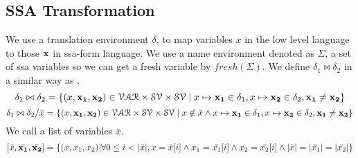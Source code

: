 \documentclass[a4paper,11pt]{article}
\begin{document}
\begin{coro}
\end{coro}

\subsection{SSA Transformation}
We use a translation environment $\delta$, to map variables $x$ in the low level language to those $\mathbf{{x}}$ in ssa-form language. We use a name environment denoted as $\Sigma$, a set of ssa variables so we can get a fresh variable by $fresh(\Sigma)$. We define $\delta_1 \bowtie \delta_2 $ in a similar way as
\cite{vekris2016refinement}.
\[ \delta_1 \bowtie \delta_2 = \{ ( x, {\mathbf{{x_1}}, \mathbf{{x_2}}} ) \in \mathcal{VAR} \times \mathcal{SV} \times \mathcal{SV} \mid x \mapsto {\mathbf{{x_1}}} \in \delta_1 , x \mapsto {\mathbf{{x_2}} } \in \delta_2, {\mathbf{{x_1}} \not= {\mathbf{{x_2}} }  }  \} \]
\[ \delta_1 \bowtie \delta_2 / \bar{x} = \{ ( x, {\mathbf{{x_1}}, \mathbf{{x_2}}} ) \in \mathcal{VAR} \times \mathcal{SV} \times \mathcal{SV} \mid x \not\in \bar{x} \land x \mapsto {\mathbf{{x_1}}} \in \delta_1 , x \mapsto {\mathbf{{x_2}} } \in \delta_2, {\mathbf{{x_1}} \not= {\mathbf{{x_2}} }   }  \} \]
We call a list of variables $\bar{x}$.
\[
 [\bar{x}, \bar{\mathbf{{x_1}}}, \bar{\mathbf{{x_2}}}] = \{ (x, x_1,x_2)  | \forall 0 \leq i < |\bar{x}|, x = \bar{x }[i] \land x_1 = \bar{x_1}[i] \land x_2 = \bar{x_2 }[i] \land |\bar{x}| = |\bar{x_1}| = |\bar{x_2}|   \}
\]
\end{document}
